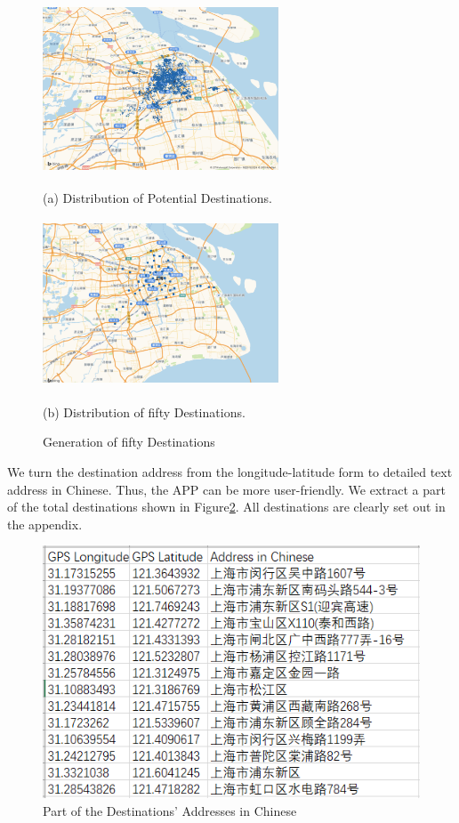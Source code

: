 \documentclass{mcmthesis}
\begin{document}
\begin{figure}[htbp]
    \begin{minipage}{0.44\linewidth}
      \centerline{\includegraphics[height=5cm,width=7cm]{figures/PotentialDetinations.png}}
      \caption*{(a) Distribution of Potential Destinations.}
    \end{minipage}
    \hspace{0.5in}
    \begin{minipage}{0.44\linewidth}
      \centerline{\includegraphics[height=5cm,width=7cm]{figures/fiftydestinations.png}}
      \caption*{(b) Distribution of fifty Destinations.}
    \end{minipage}
    \caption{Generation of fifty Destinations}
    \label{fig:twoII}
\end{figure}




We turn the destination address from the longitude-latitude form to detailed text address in Chinese. Thus, the APP can be more user-friendly. We extract a part of the total destinations shown in Figure\ref{fig:AIC}. All destinations are clearly set out in the appendix.

\begin{figure}[htbp]
    \centering
    \includegraphics{figures/AddressinChinese.png}
    \caption{Part of the Destinations' Addresses in Chinese}
    \label{fig:AIC}
\end{figure}
\end{document}
